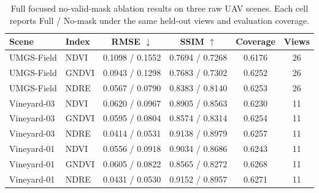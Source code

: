 \begin{table}[H]
    \caption{Full focused no-valid-mask ablation results on three raw UAV scenes. Each cell reports Full / No-mask under the same held-out views and evaluation coverage.}
    \label{tab:supp-raw-conditioning-ablation-full}
    \centering
    \tiny
    \setlength{\tabcolsep}{1.5pt}
    \begin{tabular}{@{}llcccc@{}}
        \toprule
        Scene & Index & RMSE $\downarrow$ & SSIM $\uparrow$ & Coverage & Views \\
        \midrule
        UMGS-Field & NDVI & 0.1098 / 0.1552 & 0.7694 / 0.7268 & 0.6176 & 26 \\
        UMGS-Field & GNDVI & 0.0943 / 0.1298 & 0.7683 / 0.7302 & 0.6252 & 26 \\
        UMGS-Field & NDRE & 0.0567 / 0.0790 & 0.8383 / 0.8140 & 0.6253 & 26 \\
        \midrule
        Vineyard-03 & NDVI & 0.0620 / 0.0967 & 0.8905 / 0.8563 & 0.6230 & 11 \\
        Vineyard-03 & GNDVI & 0.0595 / 0.0804 & 0.8574 / 0.8314 & 0.6254 & 11 \\
        Vineyard-03 & NDRE & 0.0414 / 0.0531 & 0.9138 / 0.8979 & 0.6257 & 11 \\
        \midrule
        Vineyard-01 & NDVI & 0.0556 / 0.0918 & 0.9034 / 0.8686 & 0.6243 & 11 \\
        Vineyard-01 & GNDVI & 0.0605 / 0.0822 & 0.8565 / 0.8272 & 0.6268 & 11 \\
        Vineyard-01 & NDRE & 0.0431 / 0.0530 & 0.9152 / 0.8957 & 0.6271 & 11 \\
        \bottomrule
    \end{tabular}
\end{table}
